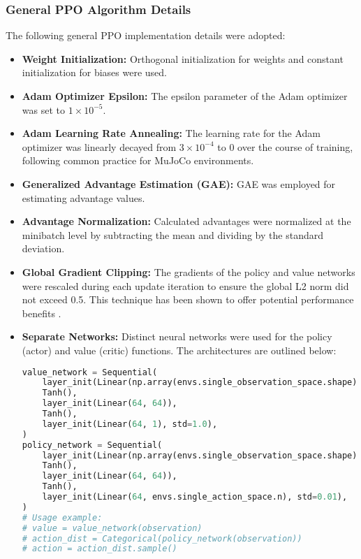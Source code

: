 \documentclass{article}
\begin{document}
\subsubsection{General PPO Algorithm Details}
The following general PPO implementation details were adopted:
\begin{itemize}
    \item \textbf{Weight Initialization:} Orthogonal initialization for weights and constant initialization for biases were used.
    \item \textbf{Adam Optimizer Epsilon:} The epsilon parameter of the Adam optimizer was set to \(1 \times 10^{-5}\).
    \item \textbf{Adam Learning Rate Annealing:} The learning rate for the Adam optimizer was linearly decayed from \(3 \times 10^{-4}\) to 0 over the course of training, following common practice for MuJoCo environments.
    \item \textbf{Generalized Advantage Estimation (GAE):} GAE was employed for estimating advantage values.
    \item \textbf{Advantage Normalization:} Calculated advantages were normalized at the minibatch level by subtracting the mean and dividing by the standard deviation.
    \item \textbf{Global Gradient Clipping:} The gradients of the policy and value networks were rescaled during each update iteration to ensure the global L2 norm did not exceed 0.5. This technique has been shown to offer potential performance benefits \cite{andrychowicz2021what}.
    \item \textbf{Separate Networks:} Distinct neural networks were used for the policy (actor) and value (critic) functions. The architectures are outlined below:

    \begin{minipage}{0.9\textwidth}
    \begin{lstlisting}[language=Python]
value_network = Sequential(
    layer_init(Linear(np.array(envs.single_observation_space.shape).prod(), 64)),
    Tanh(),
    layer_init(Linear(64, 64)),
    Tanh(),
    layer_init(Linear(64, 1), std=1.0),
)
policy_network = Sequential(
    layer_init(Linear(np.array(envs.single_observation_space.shape).prod(), 64)),
    Tanh(),
    layer_init(Linear(64, 64)),
    Tanh(),
    layer_init(Linear(64, envs.single_action_space.n), std=0.01),
)
# Usage example:
# value = value_network(observation)
# action_dist = Categorical(policy_network(observation))
# action = action_dist.sample()
    \end{lstlisting}
    \end{minipage}
\end{itemize}
\end{document}
